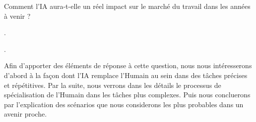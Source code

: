 Comment l'IA aura-t-elle un réel impact sur le marché du travail dans les années à venir ?\newline

.\newline

.\newline

Afin d'apporter des éléments de réponse à cette question, nous nous intéresserons d'abord à la façon dont l'IA remplace l'Humain au sein dans des tâches précises et répétitives.
Par la suite, nous verrons dans les détails le processus de spécialisation de l'Humain dans les tâches plus complexes.
Puis nous concluerons par l'explication des scénarios que nous considerons les plus probables dans un avenir proche.
